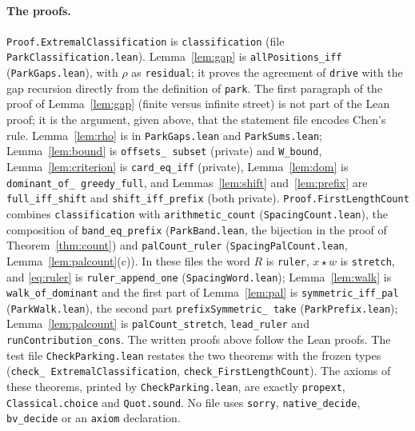 \documentclass[11pt]{article}
\theoremstyle{remark}
\begin{document}
{\paragraph{The proofs.}
\texttt{Proof.ExtremalClassification} is \texttt{classification} (file
\texttt{ParkClassification.lean}). Lemma~\ref{lem:gap} is
\texttt{allPositions\_\allowbreak iff} (\texttt{ParkGaps.lean}), with $\rho$ as
\texttt{residual}; it proves the agreement of \texttt{drive} with the gap
recursion directly from the definition of \texttt{park}. The first paragraph
of the proof of Lemma~\ref{lem:gap} (finite versus infinite street) is not part
of the Lean proof; it is the argument, given above, that the statement file
encodes Chen's rule. Lemma~\ref{lem:rho} is in \texttt{ParkGaps.lean} and
\texttt{ParkSums.lean}; Lemma~\ref{lem:bound} is \texttt{offsets\_\allowbreak
subset} (private) and \texttt{W\_\allowbreak bound}, Lemma~\ref{lem:criterion}
is \texttt{card\_\allowbreak eq\_\allowbreak iff} (private),
Lemma~\ref{lem:dom} is \texttt{dominant\_\allowbreak of\_\allowbreak
greedy\_\allowbreak full}, and Lemmas~\ref{lem:shift} and~\ref{lem:prefix} are
\texttt{full\_\allowbreak iff\_\allowbreak shift} and
\texttt{shift\_\allowbreak iff\_\allowbreak prefix} (both private).
\texttt{Proof.FirstLengthCount} combines \texttt{classification} with
\texttt{arithmetic\_\allowbreak count} (\texttt{SpacingCount.lean}), the
composition of \texttt{band\_\allowbreak eq\_\allowbreak prefix}
(\texttt{ParkBand.lean}, the bijection in the proof of
Theorem~\ref{thm:count}) and \texttt{palCount\_\allowbreak ruler}
(\texttt{SpacingPalCount.lean}, Lemma~\ref{lem:palcount}(c)). In these files the
word $R$ is \texttt{ruler}, $x\star w$ is \texttt{stretch}, and
\eqref{eq:ruler} is \texttt{ruler\_\allowbreak append\_\allowbreak one}
(\texttt{SpacingWord.lean}); Lemma~\ref{lem:walk} is
\texttt{walk\_\allowbreak of\_\allowbreak dominant} and the first part of
Lemma~\ref{lem:pal} is \texttt{symmetric\_\allowbreak iff\_\allowbreak pal}
(\texttt{ParkWalk.lean}), the second part \texttt{prefixSymmetric\_\allowbreak
take} (\texttt{ParkPrefix.lean}); Lemma~\ref{lem:palcount} is
\texttt{palCount\_\allowbreak stretch}, \texttt{lead\_\allowbreak ruler} and
\texttt{runContribution\_\allowbreak cons}. The written proofs above follow the Lean
proofs. The test file \texttt{CheckParking.lean} restates the
two theorems with the frozen types (\texttt{check\_\allowbreak
ExtremalClassification}, \texttt{check\_\allowbreak FirstLengthCount}). The
axioms of these theorems, printed by \texttt{CheckParking.lean}, are exactly
\texttt{propext}, \texttt{Classical.choice} and \texttt{Quot.sound}. No file
uses \texttt{sorry}, \texttt{native\_\allowbreak decide},
\texttt{bv\_\allowbreak decide} or an \texttt{axiom} declaration.

}
\end{document}
